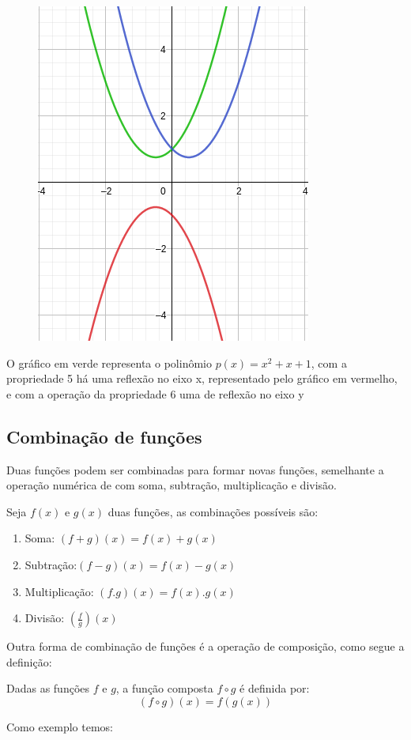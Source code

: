 \begin{multicols*}{2}
\begin{figure}[H]
        \includegraphics[scale=0.35]{assets/rafael/img11.png}
    \end{figure}
    O gráfico em verde representa o polinômio $p(x) = x^2 + x +1$, com a propriedade 5 há uma 				reflexão no eixo x, representado pelo gráfico em vermelho, e com a operação da propriedade 6 uma 		de reflexão no eixo y


    \subsection*{Combinação de funções}
    Duas funções podem ser combinadas para formar novas funções, semelhante a operação numérica de 			com soma, subtração, multiplicação e divisão.

    Seja $f(x)$ e $g(x)$ duas funções, as combinações possíveis são:
    \begin{enumerate}
        \item Soma: $(f+g)(x) = f(x) + g(x)$
        \item Subtração:$(f-g)(x) = f(x) - g(x)$
        \item Multiplicação: $(f.g)(x) = f(x).g(x)$
        \item Divisão: $\left( \frac{f}{g} \right)(x)$
    \end{enumerate}

    Outra forma de combinação de funções é a operação de composição, como segue a definição:

    \begin{theorem}
        Dadas as funções $f$ e $g$, a função composta $f \circ g$ é definida por:
        \[(f \circ g)(x) = f(g(x))\]
    \end{theorem}
    Como exemplo temos:


\end{multicols*}
